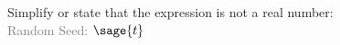 \documentclass{article}%
\begin{document}

\noindent Simplify or state that the expression is not a real number: \\
\textcolor{gray}{Random Seed: $\sage{t}$}


\begin{multicols}{3}
\begin{enumerate}
\end{enumerate}
\end{multicols}


\newpage


\begin{multicols}{3}
\begin{enumerate}
\end{enumerate}
\end{multicols}
\end{document}
